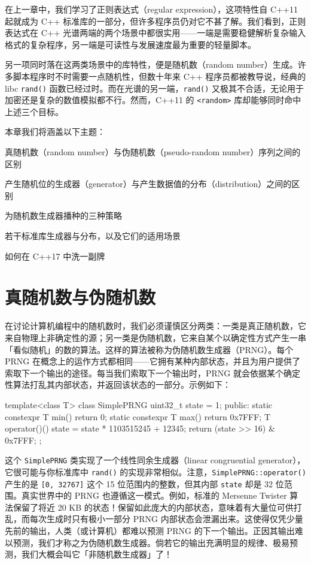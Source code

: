 在上一章中，我们学习了正则表达式（regular expression），这项特性自 C++11 起就成为 C++ 标准库的一部分，但许多程序员仍对它不甚了解。我们看到，正则表达式在 C++ 光谱两端的两个场景中都很实用——一端是需要稳健解析复杂输入格式的复杂程序，另一端是可读性与发展速度最为重要的轻量脚本。

另一项同时落在这两类场景中的库特性，便是随机数（random number）生成。许多脚本程序时不时需要一点随机性，但数十年来 C++ 程序员都被教导说，经典的 libc \texttt{rand(\allowbreak{})\allowbreak{}} 函数已经过时。而在光谱的另一端，\texttt{rand(\allowbreak{})\allowbreak{}} 又极其不合适，无论用于加密还是复杂的数值模拟都不行。然而，C++11 的 \texttt{<random>\allowbreak{}} 库却能够同时命中上述三个目标。

本章我们将涵盖以下主题：

真随机数（random number）与伪随机数（pseudo-random number）序列之间的区别

产生随机位的生成器（generator）与产生数据值的分布（distribution）之间的区别

为随机数生成器播种的三种策略

若干标准库生成器与分布，以及它们的适用场景

如何在 C++17 中洗一副牌

\section{真随机数与伪随机数}

在讨论计算机编程中的随机数时，我们必须谨慎区分两类：一类是真正随机数，它来自物理上非确定性的源；另一类是伪随机数，它来自某个以确定性方式产生一串「看似随机」的数的算法。这样的算法被称为伪随机数生成器（PRNG）。每个 PRNG 在概念上的运作方式都相同——它拥有某种内部状态，并且为用户提供了索取下一个输出的途径。每当我们索取下一个输出时，PRNG 就会依据某个确定性算法打乱其内部状态，并返回该状态的一部分。示例如下：

\begin{codebox}[cpp]
     template<class T>
     class SimplePRNG {
       uint32_t state = 1;
     public:
       static constexpr T min() { return 0; }
       static constexpr T max() { return 0x7FFF; }
       T operator()() {
         state = state * 1103515245 + 12345;
         return (state >> 16) & 0x7FFF;
       }
     };
\end{codebox}

这个 \texttt{Simple\allowbreak{}PRNG} 类实现了一个线性同余生成器（linear congruential generator），它很可能与你标准库中 \texttt{rand(\allowbreak{})\allowbreak{}} 的实现非常相似。注意，\texttt{Simple\allowbreak{}PRNG::\allowbreak{}operator(\allowbreak{})\allowbreak{}} 产生的是 \texttt{[0,\allowbreak{} 32767]} 这个 15 位范围内的整数，但其内部 \texttt{state} 却是 32 位范围。真实世界中的 PRNG 也遵循这一模式。例如，标准的 Mersenne Twister 算法保留了将近 20 KB 的状态！保留如此庞大的内部状态，意味着有大量位可供打乱，而每次生成时只有极小一部分 PRNG 内部状态会泄漏出来。这使得仅凭少量先前的输出，人类（或计算机）都难以预测 PRNG 的下一个输出。正因其输出难以预测，我们才称之为伪随机数生成器。倘若它的输出充满明显的规律、极易预测，我们大概会叫它「非随机数生成器」了！

